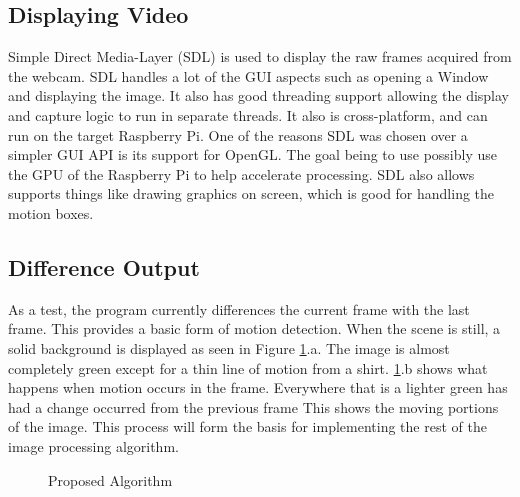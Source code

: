 \documentclass[journal]{IEEEtran}
\begin{document}
    \subsection{Displaying Video}
    Simple Direct Media-Layer (SDL) is used to display the raw frames acquired from the webcam. SDL handles a lot of the GUI aspects
    such as opening a Window and displaying the image. It also has good threading support allowing the display and capture logic
    to run in separate threads. It also is cross-platform, and can run on the target Raspberry Pi. One of the reasons SDL was chosen
    over a simpler GUI API is its support for OpenGL. The goal being to use possibly use the GPU of the Raspberry Pi to help
    accelerate processing. SDL also allows supports things like drawing graphics on screen, which is good for handling the motion
    boxes.

    \subsection{Difference Output}
    As a test, the program currently differences the current frame with the last frame. This provides a basic form of motion
    detection. When the scene is still, a solid background is displayed as seen in Figure \ref{fig:diff_output}.a. The image is
    almost completely green except for a thin line of motion from a shirt. \ref{fig:diff_output}.b shows what happens when motion
    occurs in the frame. Everywhere that is a lighter green has had a change occurred from the previous frame This shows the moving
    portions of the image. This process will form the basis for implementing the rest of the image processing algorithm.

    \begin{figure}[!t]
        \centering
        \caption{Proposed Algorithm}
        \label{fig:diff_output}
    \end{figure}
\end{document}
